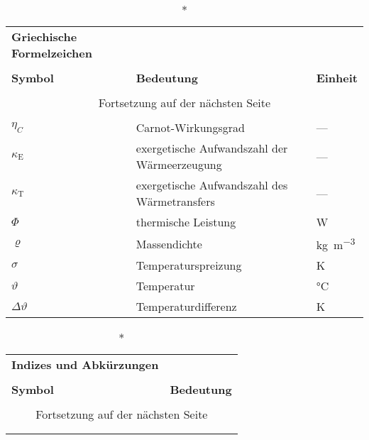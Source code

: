 \begin{onehalfspacing}
\begin{longtable}[h]{p{} p{} p{}}
		
\end{longtable}

\begin{longtable}[h]{p{} p{} p{}}
		\caption*{\textbf{Griechische Formelzeichen}} \\
		\\
		\textbf{Symbol} & \textbf{Bedeutung} & \textbf{Einheit} \\ %
		\endhead
		\\
		\multicolumn{3}{c}{Fortsetzung auf der nächsten Seite} \\
		\endfoot
		\multicolumn{3}{c}{ } \\
		\endlastfoot
		
		$\eta_{C}$ 				& Carnot-Wirkungsgrad 							& ---\\
		$\kappa_{\mathrm{E}}$ 	& exergetische Aufwandszahl der Wärmeerzeugung 	& ---\\
		$\kappa_{\mathrm{T}}$ 	& exergetische Aufwandszahl des Wärmetransfers 	& ---\\
		$\Phi$ 					& thermische Leistung 							& \si{\watt}\\
		$\varrho$				& Massendichte									& \si{\kilogram\per \metre^3}\\
		$\sigma$				& Temperaturspreizung							& \si{\kelvin}\\
		$\vartheta $ 			& Temperatur  									& \si{\celsius}\\
		$\Delta\vartheta $ 		& Temperaturdifferenz  							& \si{\kelvin}\\
		
\end{longtable}

\begin{longtable}[h]{p{} p{}}
		\caption*{\textbf{Indizes und Abkürzungen}} \\
		\\
		\textbf{Symbol} & \textbf{Bedeutung} \\ %
		\endhead
		\\
		\multicolumn{2}{c}{Fortsetzung auf der nächsten Seite} \\
		\endfoot
		\multicolumn{2}{c}{ } \\
		\endlastfoot
		

\end{longtable}
\end{onehalfspacing}
